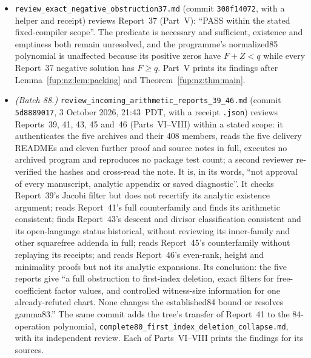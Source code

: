 \documentclass[11pt,letterpaper]{article}
\theoremstyle{definition}\newtheorem{definition}[theorem]{Definition}
\theoremstyle{remark}\newtheorem{remark}[theorem]{Remark}
\newcommand{\rw}[1]{\nolinkurl{#1}}%
\begin{document}
\begin{itemize}
\item \rw{review_exact_negative_obstruction37.md} (commit \texttt{308f14072}, with a helper and receipt) reviews Report~37 (Part~V): ``PASS within the stated fixed-compiler scope''. The predicate is necessary and sufficient, existence and emptiness both remain unresolved, and the programme's normalized85 polynomial is unaffected because its positive zeros have $F+Z<q$ while every Report~37 negative solution has $F\ge q$. Part~V prints its findings after Lemma~\ref{fup:nz:lem:packing} and Theorem~\ref{fup:nz:thm:main}.
\item \emph{(Batch 88.)} \rw{review_incoming_arithmetic_reports_39_46.md} (commit \texttt{5d8889017}, 3 October 2026, 21:43~PDT, with a receipt \rw{.json}) reviews Reports~39, 41, 43, 45 and~46 (Parts~VI--VIII) within a stated scope: it authenticates the five archives and their 408 members, reads the five delivery READMEs and eleven further proof and source notes in full, executes no archived program and reproduces no package test count; a second reviewer re-verified the hashes and cross-read the note. It is, in its words, ``not approval of every manuscript, analytic appendix or saved diagnostic''. It checks Report~39's Jacobi filter but does not recertify its analytic existence argument; reads Report~41's full counterfamily and finds its arithmetic consistent; finds Report~43's descent and divisor classification consistent and its open-language status historical, without reviewing its inner-family and other squarefree addenda in full; reads Report~45's counterfamily without replaying its receipts; and reads Report~46's even-rank, height and minimality proofs but not its analytic expansions. Its conclusion: the five reports give ``a full obstruction to first-index deletion, exact filters for free-coefficient factor values, and controlled witness-size information for one already-refuted chart. None changes the established84 bound or resolves gamma83.'' The same commit adds the tree's transfer of Report~41 to the 84-operation polynomial, \rw{complete80_first_index_deletion_collapse.md}, with its independent review. Each of Parts~VI--VIII prints the findings for its sources.
\end{itemize}
\end{document}
